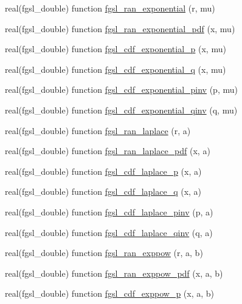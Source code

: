 \begin{DoxyCompactItemize}
\item 
real(fgsl\-\_\-double) function \hyperlink{rng_8finc_a6e0d7e6eadeddedceacd263ef26203d0}{fgsl\-\_\-ran\-\_\-exponential} (r, mu)
\item 
real(fgsl\-\_\-double) function \hyperlink{rng_8finc_ae756f259cb8ca3982f646f42a216c96c}{fgsl\-\_\-ran\-\_\-exponential\-\_\-pdf} (x, mu)
\item 
real(fgsl\-\_\-double) function \hyperlink{rng_8finc_a36e9a6ea0993d74b7a8cf7961709fe3c}{fgsl\-\_\-cdf\-\_\-exponential\-\_\-p} (x, mu)
\item 
real(fgsl\-\_\-double) function \hyperlink{rng_8finc_a955e14385e325a6372b465a576cac5c4}{fgsl\-\_\-cdf\-\_\-exponential\-\_\-q} (x, mu)
\item 
real(fgsl\-\_\-double) function \hyperlink{rng_8finc_a488b0d0037afbf0758a6494ea2c79d4b}{fgsl\-\_\-cdf\-\_\-exponential\-\_\-pinv} (p, mu)
\item 
real(fgsl\-\_\-double) function \hyperlink{rng_8finc_a8981dddfb5aa981d5819588d5e6ef0c3}{fgsl\-\_\-cdf\-\_\-exponential\-\_\-qinv} (q, mu)
\item 
real(fgsl\-\_\-double) function \hyperlink{rng_8finc_a4720051c5ef1f7ebcb32a852ac6664cb}{fgsl\-\_\-ran\-\_\-laplace} (r, a)
\item 
real(fgsl\-\_\-double) function \hyperlink{rng_8finc_ab7e39d0b6571ba191082ae83e3586791}{fgsl\-\_\-ran\-\_\-laplace\-\_\-pdf} (x, a)
\item 
real(fgsl\-\_\-double) function \hyperlink{rng_8finc_ae5ad59c95e21c0d422034ad7d56f8257}{fgsl\-\_\-cdf\-\_\-laplace\-\_\-p} (x, a)
\item 
real(fgsl\-\_\-double) function \hyperlink{rng_8finc_a2e38b7a4c5542ab96393a85ac86c3aa5}{fgsl\-\_\-cdf\-\_\-laplace\-\_\-q} (x, a)
\item 
real(fgsl\-\_\-double) function \hyperlink{rng_8finc_a372ea8f42cb280034be93978a227aac8}{fgsl\-\_\-cdf\-\_\-laplace\-\_\-pinv} (p, a)
\item 
real(fgsl\-\_\-double) function \hyperlink{rng_8finc_ae60ab38aedb8d6fb86fbc16d33b8e2fa}{fgsl\-\_\-cdf\-\_\-laplace\-\_\-qinv} (q, a)
\item 
real(fgsl\-\_\-double) function \hyperlink{rng_8finc_a3a4e76ecca55fc88d05ad1dd87b11ecd}{fgsl\-\_\-ran\-\_\-exppow} (r, a, b)
\item 
real(fgsl\-\_\-double) function \hyperlink{rng_8finc_a87c230357f577305a4bd93c4f304e2af}{fgsl\-\_\-ran\-\_\-exppow\-\_\-pdf} (x, a, b)
\item 
real(fgsl\-\_\-double) function \hyperlink{rng_8finc_a332787d73c8b7cc0a561b9de42eab974}{fgsl\-\_\-cdf\-\_\-exppow\-\_\-p} (x, a, b)

\end{DoxyCompactItemize}
